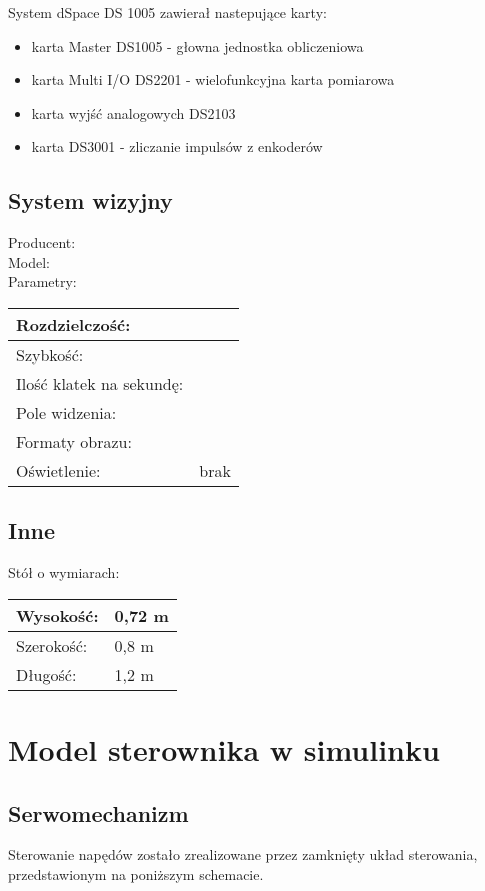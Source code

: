 System dSpace DS 1005 zawierał nastepujące karty:
\begin{itemize}
\item karta Master DS1005 - głowna jednostka obliczeniowa
\item karta Multi I/O DS2201 - wielofunkcyjna karta pomiarowa
\item karta wyjść analogowych DS2103
\item karta DS3001 - zliczanie impulsów z enkoderów
\end{itemize}

\subsection{System wizyjny}
\noindent Producent:\\
Model:\\
Parametry:\\
\noindent \begin{tabular}{|l|l|} \hline
{Rozdzielczość: }& \\ \hline
{Szybkość: } &\\ \hline
{Ilość klatek na sekundę: }&\\ \hline
{Pole widzenia: }&\\ \hline
{Formaty obrazu: }& \\ \hline
{Oświetlenie: }& {brak} \\ \hline
\end{tabular}
\subsection{Inne}
\noindent Stół o wymiarach:\\
\begin{tabular}{|l|l|}\hline
Wysokość: & 0,72 m\\ \hline
Szerokość: & 0,8 m\\ \hline
Długość: & 1,2 m\\ \hline
\end{tabular}
\section{Model sterownika w simulinku}
\label{sec:modelWSimulinku}

\subsection{Serwomechanizm}
\label{subsec:Serwomechanizm}

Sterowanie napędów zostało zrealizowane przez zamknięty układ sterowania, przedstawionym na poniższym schemacie. %

